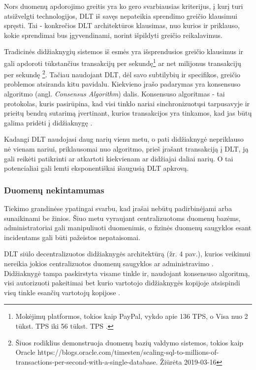 Nors duomenų apdorojimo greitis yra ko gero svarbiausias kriterijus, į kurį turi atsižvelgti technologijos, DLT iš savęs nepateikia sprendimo greičio klausimui spręsti. Tai - konkrečios DLT architektūros klausimas, nuo kurios ir priklauso, kokie sprendimai bus įgyvendinami, norint išpildyti greičio reikalavimus.

Tradicinės didžiaknygių sistemos iš esmės yra išsprendusios greičio klausimus ir gali apdoroti tūkstančius transakcijų per sekundę\footnote{Mokėjimų platformos, tokios kaip PayPal, vykdo apie 136 TPS, o Visa nuo 2 tūkst. TPS iki 56 tūkst. TPS \cite{herrera2016privacy}.} ar net milijonus transakcijų per sekundę \footnote{Šiuos rodiklius demonstruoja duomenų bazių valdymo sistemos, tokios kaip Oracle https://blogs.oracle.com/timesten/scaling-sql-to-millions-of-transactions-per-second-with-a-single-database. Žiūrėta 2019-03-16}. Tačiau naudojant DLT, dėl savo subtilybių ir specifikos, greičio problemos atsiranda kitu pavidalu. Kiekvieno įrašo padarymas yra konsensuso algoritmo (angl. \textit{Consensus Algorithm}) dalis. Konsensuso algoritmas - tai protokolas, kuris pasirūpina, kad visi tinklo nariai sinchronizuotųsi tarpusavyje ir prieitų bendrą sutarimą įvertinant, kurios transakcijos yra tinkamos, kad jas būtų galima pridėti į didžiaknygę \cite{cachin2017blockchain}. 

Kadangi DLT naudojasi daug narių vienu metu, o pati didžiaknygė nepriklauso nė vienam nariui, priklausomai nuo algoritmo, prieš įrašant transakciją į DLT, ją gali reikėti patikrinti ar atkartoti kiekvienam ar didžiajai daliai narių. O tai potencialiai gali lemti eksponentiškai išaugusią DLT apkrovą. 




\subsubsection{Duomenų nekintamumas}

Tiekimo grandinėse ypatingai svarbu, kad įrašai nebūtų padirbinėjami arba sunaikinami be žinios. Šiuo metu vyraujant centralizuotoms duomenų bazėms, administratoriai gali manipuliuoti duomenimis, o fizinės duomenų saugyklos esant incidentams gali būti pažeistos nepataisomai.

DLT siūlo decentralizuotos didžiaknygės architektūrą (žr. 4 pav.), kurios veikimui nereikia jokios centralizuotos duomenų saugyklos ar administravimo \cite{yu2018virtualization}. Didžiaknygė tampa paskirstyta visame tinkle ir, naudojant konsensuso algoritmą, visi autorizuoti pakeitimai bet kurio vartotojo didžiaknygės kopijoje atsispindi visų tinkle esančių vartotojų kopijose \cite{puthal2018blockchain}. 

